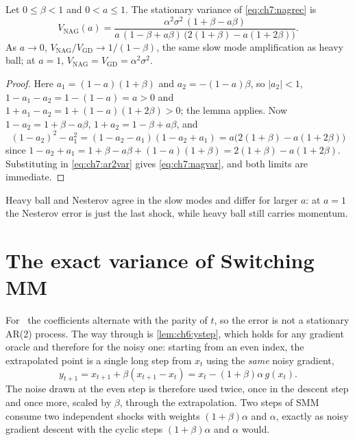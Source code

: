\begin{proposition}\label{prop:ch7:nag}
Let $0\le\beta<1$ and $0<a\le1$. The stationary variance of
\eqref{eq:ch7:nagrec} is
\begin{equation}\label{eq:ch7:nagvar}
  V_{\mathrm{NAG}}(a)=\frac{\alpha^2\sigma^2\,(1+\beta-a\beta)}
  {a\,(1-\beta+a\beta)\,\bigl(2(1+\beta)-a(1+2\beta)\bigr)} .
\end{equation}
As $a\to0$, $V_{\mathrm{NAG}}/V_{\mathrm{GD}}\to1/(1-\beta)$, the same slow mode
amplification as heavy ball; at $a=1$, $V_{\mathrm{NAG}}=V_{\mathrm{GD}}=\alpha^2\sigma^2$.
\end{proposition}

\begin{proof}
Here $a_1=(1-a)(1+\beta)$ and $a_2=-(1-a)\beta$, so $|a_2|<1$,
$1-a_1-a_2=1-(1-a)=a>0$ and $1+a_1-a_2=1+(1-a)(1+2\beta)>0$; the lemma applies.
Now $1-a_2=1+\beta-a\beta$, $1+a_2=1-\beta+a\beta$, and
\[
  (1-a_2)^2-a_1^2=(1-a_2-a_1)(1-a_2+a_1)=a\bigl(2(1+\beta)-a(1+2\beta)\bigr)
\]
since $1-a_2+a_1=1+\beta-a\beta+(1-a)(1+\beta)=2(1+\beta)-a(1+2\beta)$.
Substituting in \eqref{eq:ch7:ar2var} gives \eqref{eq:ch7:nagvar}, and both
limits are immediate.
\end{proof}

Heavy ball and Nesterov agree in the slow modes and differ for larger $a$: at
$a=1$ the Nesterov error is just the last shock, while heavy ball still carries
momentum.

\section{The exact variance of Switching MM}\label{sec:ch7:smmvar}

For \smmdet\ the coefficients alternate with the parity of $t$, so the error is
not a stationary AR(2) process. The way through is \cref{lem:ch6:ystep}, which
holds for any gradient oracle and therefore for the noisy one: starting from an
even index, the extrapolated point is a single long step from $x_t$ using the
\emph{same} noisy gradient,
\[
  y_{t+1}=x_{t+1}+\beta(x_{t+1}-x_t)=x_t-(1+\beta)\alpha\,g(x_t).
\]
The noise drawn at the even step is therefore used twice, once in the descent
step and once more, scaled by $\beta$, through the extrapolation. Two steps of
SMM consume two independent shocks with weights $(1+\beta)\alpha$ and $\alpha$,
exactly as noisy gradient descent with the cyclic steps $(1+\beta)\alpha$ and
$\alpha$ would.

